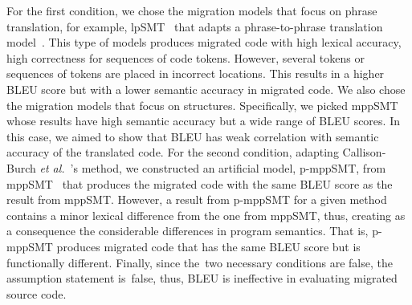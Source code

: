 For the first condition, we chose the migration models that focus on
phrase translation, for example, lpSMT~\cite{fse13-nier} that adapts a
phrase-to-phrase translation model~\cite{phrasal10}. This type of
models produces migrated code with high lexical accuracy, \ie high
correctness for sequences of code tokens. However, several tokens or
sequences of tokens are placed in incorrect locations.  This results
in a higher BLEU score but with a lower semantic accuracy in migrated
code. We also chose the migration models that focus on
structures. Specifically, we picked mppSMT~\cite{ase15} whose results have
high semantic accuracy but a wide range of BLEU
scores. In this case, we aimed to show that BLEU has weak correlation
with semantic accuracy of the translated code.
%
For the second condition, adapting Callison-Burch {\em et
  al.}~\cite{Callison}'s method, we constructed an artificial model,
p-mppSMT, from mppSMT~\cite{ase15} that produces the migrated code
with the same BLEU score as the result from mppSMT. However, a result
from p-mppSMT for a given method contains a minor lexical difference
from the one from mppSMT, thus, creating as a consequence 
the considerable differences in program semantics. That is, p-mppSMT
produces migrated code that has the same BLEU score but is
functionally different.
%
Finally, since the~two necessary conditions are false,
the assumption statement is~false, thus, BLEU is ineffective in
evaluating migrated source code.



%
%


